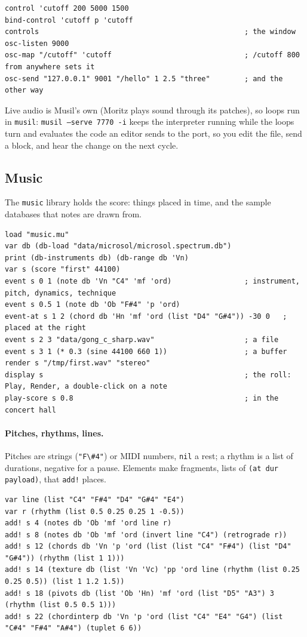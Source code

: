 \documentclass[11pt,a4paper]{article}
\newcommand{\musil}[1]{\lstinline[style=musilinline]{#1}}
\begin{document}
\begin{lstlisting}
control 'cutoff 200 5000 1500
bind-control 'cutoff p 'cutoff
controls                                                ; the window
osc-listen 9000
osc-map "/cutoff" 'cutoff                               ; /cutoff 800 from anywhere sets it
osc-send "127.0.0.1" 9001 "/hello" 1 2.5 "three"        ; and the other way
\end{lstlisting}

Live audio is Musil's own (Moritz plays sound through its patches), so loops run in
\texttt{musil}: \texttt{musil --serve 7770 -i} keeps the interpreter running while the loops
turn and evaluates the code an editor sends to the port, so you edit the file, send a block,
and hear the change on the next cycle.

\subsection{Music}

The \texttt{music} library holds the score: things placed in time, and the sample
databases that notes are drawn from.

\begin{lstlisting}
load "music.mu"
var db (db-load "data/microsol/microsol.spectrum.db")
print (db-instruments db) (db-range db 'Vn)
var s (score "first" 44100)
event s 0 1 (note db 'Vn "C4" 'mf 'ord)                 ; instrument, pitch, dynamics, technique
event s 0.5 1 (note db 'Ob "F#4" 'p 'ord)
event-at s 1 2 (chord db 'Hn 'mf 'ord (list "D4" "G#4")) -30 0   ; placed at the right
event s 2 3 "data/gong_c_sharp.wav"                     ; a file
event s 3 1 (* 0.3 (sine 44100 660 1))                  ; a buffer
render s "/tmp/first.wav" "stereo"
display s                                               ; the roll: Play, Render, a double-click on a note
play-score s 0.8                                        ; in the concert hall
\end{lstlisting}

\paragraph{Pitches, rhythms, lines.} Pitches are strings (\musil{"F\#4"}) or MIDI numbers,
\musil{nil} a rest; a rhythm is a list of durations, negative for a pause. Elements make
fragments, lists of \musil{(at dur payload)}, that \musil{add!} places.

\begin{lstlisting}
var line (list "C4" "F#4" "D4" "G#4" "E4")
var r (rhythm (list 0.5 0.25 0.25 1 -0.5))
add! s 4 (notes db 'Ob 'mf 'ord line r)
add! s 8 (notes db 'Ob 'mf 'ord (invert line "C4") (retrograde r))
add! s 12 (chords db 'Vn 'p 'ord (list (list "C4" "F#4") (list "D4" "G#4")) (rhythm (list 1 1)))
add! s 14 (texture db (list 'Vn 'Vc) 'pp 'ord line (rhythm (list 0.25 0.25 0.5)) (list 1 1.2 1.5))
add! s 18 (pivots db (list 'Ob 'Hn) 'mf 'ord (list "D5" "A3") 3 (rhythm (list 0.5 0.5 1)))
add! s 22 (chordinterp db 'Vn 'p 'ord (list "C4" "E4" "G4") (list "C#4" "F#4" "A#4") (tuplet 6 6))
\end{lstlisting}
\end{document}
